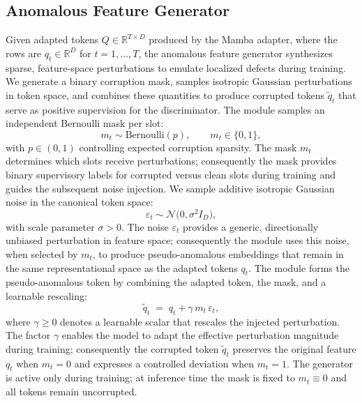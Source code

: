 \subsection{Anomalous Feature Generator}

Given adapted tokens \(Q\in\mathbb{R}^{T\times D}\) produced by the Mamba adapter, where the rows are \(q_t\in\mathbb{R}^D\) for \(t=1,\dots,T\), the anomalous feature generator synthesizes sparse, feature-space perturbations to emulate localized defects during training. We generate a binary corruption mask, samples isotropic Gaussian perturbations in token space, and combines these quantities to produce corrupted tokens \(\tilde{q}_t\) that serve as positive supervision for the discriminator. The module samples an independent Bernoulli mask per slot:
\begin{equation}
m_t \sim \mathrm{Bernoulli}(p),\qquad m_t\in\{0,1\},
\end{equation}
with \(p\in(0,1)\) controlling expected corruption sparsity. The mask \(m_t\) determines which slots receive perturbations; consequently the mask provides binary supervisory labels for corrupted versus clean slots during training and guides the subsequent noise injection. We sample additive isotropic Gaussian noise in the canonical token space:
\begin{equation}
\varepsilon_t \sim \mathcal{N}\big(0,\sigma^2 I_D\big),
\end{equation}
with scale parameter \(\sigma>0\). The noise \(\varepsilon_t\) provides a generic, directionally unbiased perturbation in feature space; consequently the module uses this noise, when selected by \(m_t\), to produce pseudo-anomalous embeddings that remain in the same representational space as the adapted tokens \(q_t\). The module forms the pseudo-anomalous token by combining the adapted token, the mask, and a learnable rescaling:
\begin{equation}
\tilde{q}_t \;=\; q_t + \gamma\, m_t\, \varepsilon_t,
\end{equation}
where \(\gamma\ge 0\) denotes a learnable scalar that rescales the injected perturbation. The factor \(\gamma\) enables the model to adapt the effective perturbation magnitude during training; consequently the corrupted token \(\tilde{q}_t\) preserves the original feature \(q_t\) when \(m_t=0\) and expresses a controlled deviation when \(m_t=1\). The generator is active only during training; at inference time the mask is fixed to \(m_t\equiv 0\) and all tokens remain uncorrupted.

